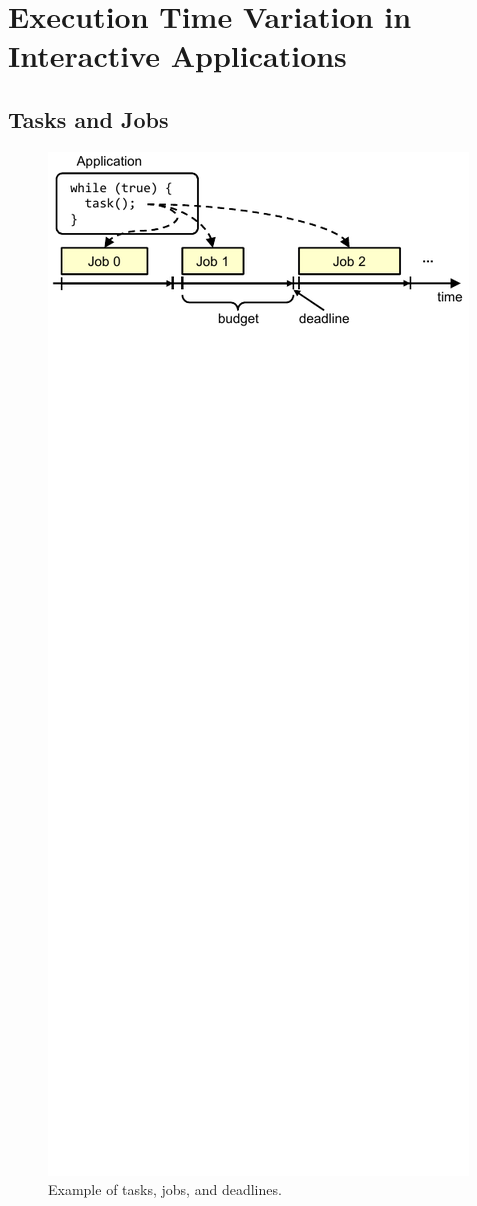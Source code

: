 \section{Execution Time Variation in Interactive Applications}
\label{sec:apps}

\subsection{Tasks and Jobs}

\begin{figure}
  \begin{center}
    \includegraphics{exec_time_prediction/figs/jobs.pdf}
    \caption{Example of tasks, jobs, and deadlines.}
    \label{fig:applications.jobs}
  \end{center}
\end{figure}

